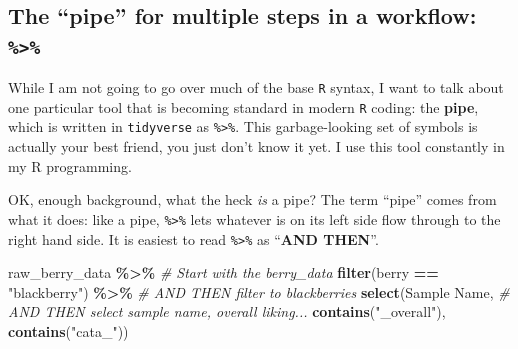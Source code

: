 \documentclass[
]{book}
\newenvironment{Shaded}{\begin{snugshade}}{\end{snugshade}}
\newcommand{\AttributeTok}[1]{\textcolor[rgb]{0.13,0.29,0.53}{#1}}
\newcommand{\CommentTok}[1]{\textcolor[rgb]{0.56,0.35,0.01}{\textit{#1}}}
\newcommand{\FunctionTok}[1]{\textcolor[rgb]{0.13,0.29,0.53}{\textbf{#1}}}
\newcommand{\NormalTok}[1]{#1}
\newcommand{\SpecialCharTok}[1]{\textcolor[rgb]{0.81,0.36,0.00}{\textbf{#1}}}
\newcommand{\StringTok}[1]{\textcolor[rgb]{0.31,0.60,0.02}{#1}}
\begin{document}
\hypertarget{the-pipe-for-multiple-steps-in-a-workflow}{%
\subsection{\texorpdfstring{The ``pipe'' for multiple steps in a workflow: \texttt{\%\textgreater{}\%}}{The ``pipe'' for multiple steps in a workflow: \%\textgreater\%}}\label{the-pipe-for-multiple-steps-in-a-workflow}}

While I am not going to go over much of the base \texttt{R} syntax, I want to talk about one particular tool that is becoming standard in modern \texttt{R} coding: the \textbf{pipe}, which is written in \texttt{tidyverse} as \texttt{\%\textgreater{}\%}. This garbage-looking set of symbols is actually your best friend, you just don't know it yet. I use this tool constantly in my R programming.

OK, enough background, what the heck \emph{is} a pipe? The term ``pipe'' comes from what it does: like a pipe, \texttt{\%\textgreater{}\%} lets whatever is on its left side flow through to the right hand side. It is easiest to read \texttt{\%\textgreater{}\%} as ``\textbf{AND THEN}''.

\begin{Shaded}
\begin{Highlighting}[]
\NormalTok{raw\_berry\_data }\SpecialCharTok{\%\textgreater{}\%}                         \CommentTok{\# Start with the berry\_data}
  \FunctionTok{filter}\NormalTok{(berry }\SpecialCharTok{==} \StringTok{"blackberry"}\NormalTok{) }\SpecialCharTok{\%\textgreater{}\%}        \CommentTok{\# AND THEN filter to blackberries}
  \FunctionTok{select}\NormalTok{(}\StringTok{\textasciigrave{}}\AttributeTok{Sample Name}\StringTok{\textasciigrave{}}\NormalTok{,                    }\CommentTok{\# AND THEN select sample name, overall liking...}
         \FunctionTok{contains}\NormalTok{(}\StringTok{"\_overall"}\NormalTok{), }
         \FunctionTok{contains}\NormalTok{(}\StringTok{"cata\_"}\NormalTok{))}
\end{Highlighting}
\end{Shaded}
\end{document}
